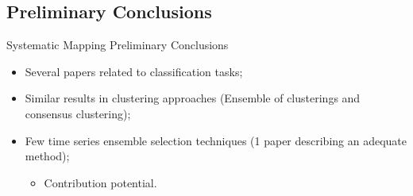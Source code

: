 \documentclass{beamer}
\begin{document}
\subsection{Preliminary Conclusions}
\begin{frame}{Systematic Mapping Preliminary Conclusions}
  \begin{itemize}
  \item Several papers related to classification tasks;
  \item Similar results in clustering approaches (Ensemble of clusterings and consensus clustering);
  \item Few time series ensemble selection techniques (1 paper describing an adequate method);
    \begin{itemize}
    \item Contribution potential.
    \end{itemize}
  \end{itemize}
\end{frame}

\section{}
\begin{frame}
  \titlepage
\end{frame}
\end{document}
